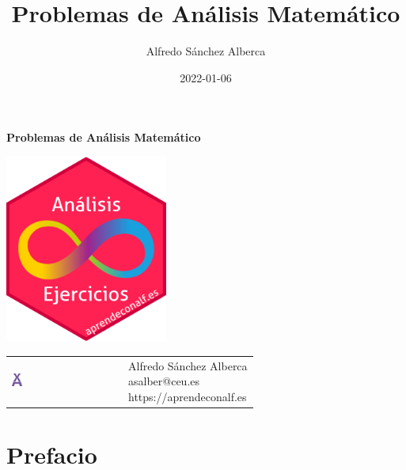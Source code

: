 \documentclass[
  a4paper,
]{scrreport}
\title{Problemas de Análisis Matemático}
\author{Alfredo Sánchez Alberca}
\date{2022-01-06}
\renewcommand*\contentsname{Tabla de contenidos}
\newcommand\contentsname{Tabla de contenidos}
\theoremstyle{definition}
\theoremstyle{remark}
\begin{document}
\begin{titlepage}

\begin{center}
\vspace*{5cm}

\Huge
{\textbf{\textsf{Problemas de Análisis Matemático}}}

\vspace{0.5cm}
\LARGE
{\textbf{\textsf{}}}

\vspace{1.5cm}

\includegraphics[width=0.4\textwidth]{img/logos/sticker.png}
\end{center}

\vfill

\begin{flushleft}
\begin{tabular}{ll}
\includegraphics[width=0.1\textwidth]{img/logos/aprendeconalf.png} & \parbox[b]{5cm}{\Large\textsf{Alfredo
Sánchez
Alberca}\\ \textsf{asalber@ceu.es} \\ \textsf{https://aprendeconalf.es}}
\end{tabular}
\end{flushleft}
\end{titlepage}
\renewcommand*\contentsname{Tabla de contenidos}
{
\hypersetup{linkcolor=}
\setcounter{tocdepth}{2}
\tableofcontents
}


\chapter*{Prefacio}\label{prefacio}
\end{document}

